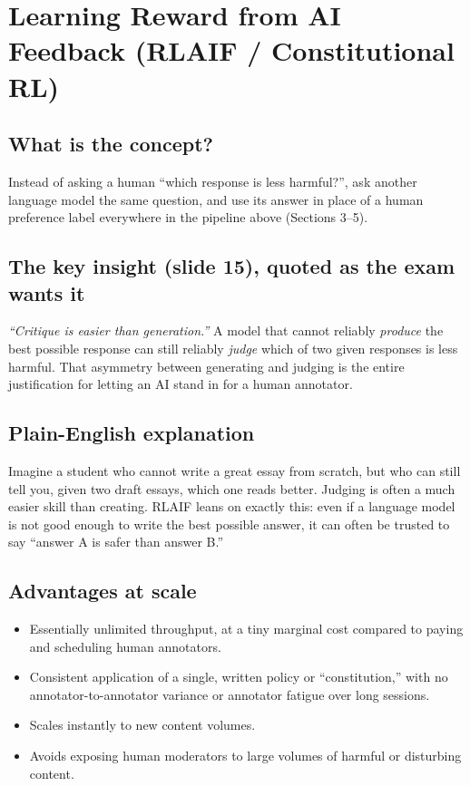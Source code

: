 \documentclass[11pt]{article}
\begin{document}
\section{Learning Reward from AI Feedback (RLAIF / Constitutional RL)}

\subsection{What is the concept?}
Instead of asking a human ``which response is less harmful?'', ask another
language model the same question, and use its answer in place of a human
preference label everywhere in the pipeline above (Sections 3--5).

\subsection{The key insight (slide 15), quoted as the exam wants it}
\emph{``Critique is easier than generation.''} A model that cannot reliably
\emph{produce} the best possible response can still reliably \emph{judge} which
of two given responses is less harmful. That asymmetry between generating and
judging is the entire justification for letting an AI stand in for a human
annotator.

\subsection{Plain-English explanation}
Imagine a student who cannot write a great essay from scratch, but who can still
tell you, given two draft essays, which one reads better. Judging is often a much
easier skill than creating. RLAIF leans on exactly this: even if a language model
is not good enough to write the best possible answer, it can often be trusted to
say ``answer A is safer than answer B.''

\subsection{Advantages at scale}
\begin{itemize}
  \item Essentially unlimited throughput, at a tiny marginal cost compared to
  paying and scheduling human annotators.
  \item Consistent application of a single, written policy or ``constitution,''
  with no annotator-to-annotator variance or annotator fatigue over long
  sessions.
  \item Scales instantly to new content volumes.
  \item Avoids exposing human moderators to large volumes of harmful or
  disturbing content.
\end{itemize}
\end{document}
